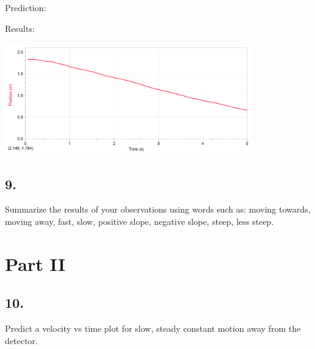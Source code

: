     \begin{mdframed}
        \centering Prediction:


        Results:

        \centering\includegraphics[width=0.8\textwidth]{image20.png}
    \end{mdframed}

    \subsection*{9.}
    Summarize the results of your observations using words such as: moving towards, moving away, fast, slow, positive slope, negative slope, steep, less steep.

    \begin{mdframed}
        
    \end{mdframed}

    \section*{Part II}

    \subsection*{10.}
    Predict a velocity vs time plot for slow, steady constant motion away from the detector. 

